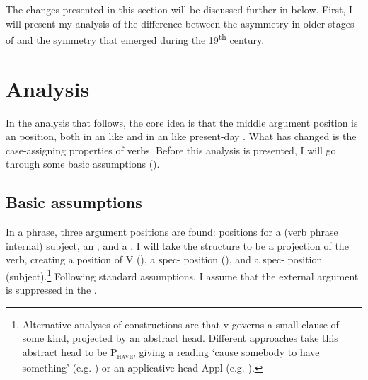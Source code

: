 \documentclass[output=paper]{langscibook}
\begin{document}
The changes presented in this section will be discussed further in  below. First, I will present my analysis of the difference between the asymmetry in older stages of  and the symmetry that emerged during the 19\textsuperscript{th} century.

\section{Analysis}\label{sec:falk:4}


In the analysis that follows, the core idea is that the middle argument position is an  position, both in an  like  and in an  like present-day . What has changed is the case-assigning properties of  verbs. Before this analysis is presented, I will go through some basic assumptions ().

\subsection{Basic assumptions}\label{sec:falk:4.1}


In a  phrase, three argument positions are found: positions for a (verb phrase internal) subject, an , and a . I will take the structure to be a projection of the verb, creating a  position of V (), a spec- position (), and a spec- position (subject).\footnote{Alternative analyses of  constructions are that v governs a small clause of some kind, projected by an abstract head. Different approaches take this abstract head to be P\textsc{\textsubscript{have}}, giving a reading ‘cause somebody to have something’ (e.g. \citealt{HarleyJung2015}) or an applicative head Appl (e.g. \citealt{Pylkkanen2008}).} Following standard assumptions, I assume that the external argument is suppressed in the .
\end{document}
